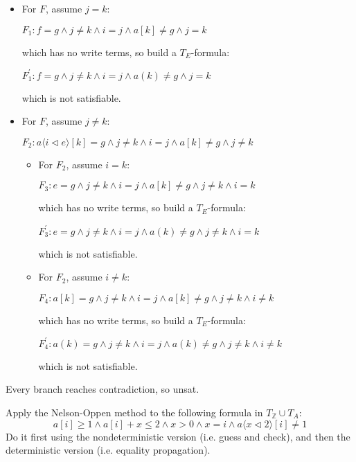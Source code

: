 \documentclass[11pt,a4paper]{article}
\renewcommand{\int}{\mathbb{Z}}
\newcommand{\upd}[2]{\langle #1 \triangleleft #2 \rangle}
\begin{document}
\begin{solution}
  \begin{itemize}
    \item For $F$, assume $j = k$:
    
     $F_1: f=g \land j\not=k \land i=j \land a[k]\not=g \land j = k$
     
     which has no write terms, so build a $T_E$-formula:
     
     $F_1^\prime: f = g \land j\not=k \land i=j \land a(k)\not=g \land j = k$
     
     which is not satisfiable.
    \item For $F$, assume $j \ne k$:
    
    $F_2: a\upd{i}{e}[k] = g \land j\not=k \land i=j \land a[k]\not=g \land j \ne k$
    
    \begin{itemize}
      \item For $F_2$, assume $i = k$:
      
      $F_3: e = g \land j\not=k \land i=j \land a[k]\not=g \land j \ne k \land i = k$
       
      which has no write terms, so build a $T_E$-formula:
      
      $F_3^\prime: e = g \land j\not=k \land i=j \land a(k)\not=g \land j \ne k \land i = k$
       
      which is not satisfiable.
      
      \item For $F_2$, assume $i \ne k$:
      
      $F_4: a[k] = g \land j\not=k \land i=j \land a[k]\not=g \land j \ne k \land i \ne k$
      
      which has no write terms, so build a $T_E$-formula:
      
      $F_4^\prime: a(k) = g \land j\not=k \land i=j \land a(k)\not=g \land j \ne k \land i \ne k$
      
      which is not satisfiable.
    \end{itemize}
  \end{itemize}

  Every branch reaches contradiction, so unsat.
\end{solution}

\subproblem Apply the Nelson-Oppen method to the following formula in $T_\int \cup T_A$:
$$a[i] \ge 1 \land a[i]+x \le 2 \land x>0 \land x=i \land a\upd{x}{2}[i]\not=1$$
Do it first using the nondeterministic version (i.e. guess and check), and then the deterministic version (i.e. equality propagation).
\end{document}
